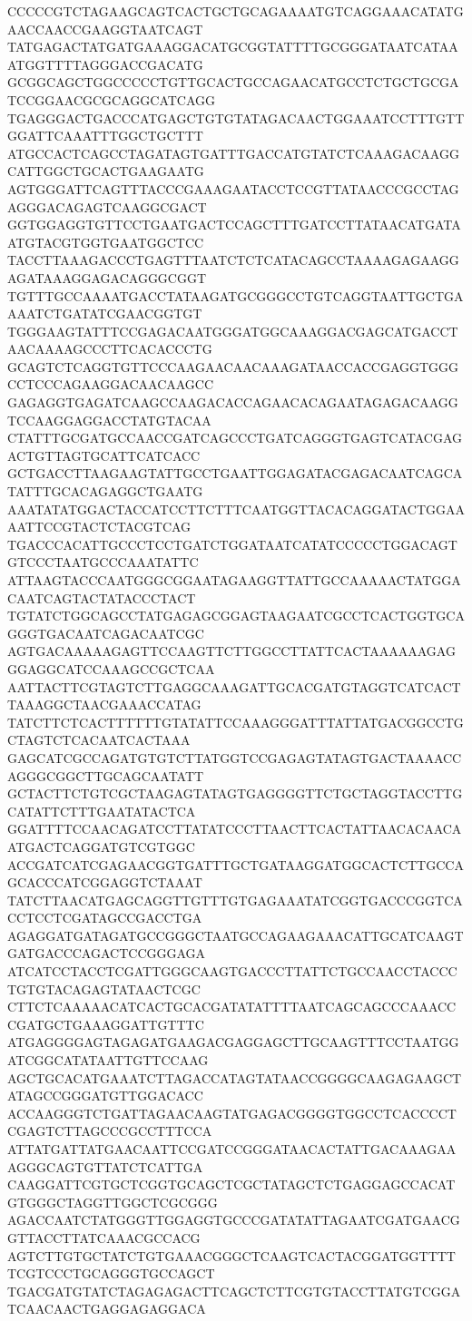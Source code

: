 CCCCCGTCTAGAAGCAGTCACTGCTGCAGAAAATGTCAGGAAACATATGAACCAACCGAAGGTAATCAGT
TATGAGACTATGATGAAAGGACATGCGGTATTTTGCGGGATAATCATAAATGGTTTTAGGGACCGACATG
GCGGCAGCTGGCCCCCTGTTGCACTGCCAGAACATGCCTCTGCTGCGATCCGGAACGCGCAGGCATCAGG
TGAGGGACTGACCCATGAGCTGTGTATAGACAACTGGAAATCCTTTGTTGGATTCAAATTTGGCTGCTTT
ATGCCACTCAGCCTAGATAGTGATTTGACCATGTATCTCAAAGACAAGGCATTGGCTGCACTGAAGAATG
AGTGGGATTCAGTTTACCCGAAAGAATACCTCCGTTATAACCCGCCTAGAGGGACAGAGTCAAGGCGACT
GGTGGAGGTGTTCCTGAATGACTCCAGCTTTGATCCTTATAACATGATAATGTACGTGGTGAATGGCTCC
TACCTTAAAGACCCTGAGTTTAATCTCTCATACAGCCTAAAAGAGAAGGAGATAAAGGAGACAGGGCGGT
TGTTTGCCAAAATGACCTATAAGATGCGGGCCTGTCAGGTAATTGCTGAAAATCTGATATCGAACGGTGT
TGGGAAGTATTTCCGAGACAATGGGATGGCAAAGGACGAGCATGACCTAACAAAAGCCCTTCACACCCTG
GCAGTCTCAGGTGTTCCCAAGAACAACAAAGATAACCACCGAGGTGGGCCTCCCAGAAGGACAACAAGCC
GAGAGGTGAGATCAAGCCAAGACACCAGAACACAGAATAGAGACAAGGTCCAAGGAGGACCTATGTACAA
CTATTTGCGATGCCAACCGATCAGCCCTGATCAGGGTGAGTCATACGAGACTGTTAGTGCATTCATCACC
GCTGACCTTAAGAAGTATTGCCTGAATTGGAGATACGAGACAATCAGCATATTTGCACAGAGGCTGAATG
AAATATATGGACTACCATCCTTCTTTCAATGGTTACACAGGATACTGGAAAATTCCGTACTCTACGTCAG
TGACCCACATTGCCCTCCTGATCTGGATAATCATATCCCCCTGGACAGTGTCCCTAATGCCCAAATATTC
ATTAAGTACCCAATGGGCGGAATAGAAGGTTATTGCCAAAAACTATGGACAATCAGTACTATACCCTACT
TGTATCTGGCAGCCTATGAGAGCGGAGTAAGAATCGCCTCACTGGTGCAGGGTGACAATCAGACAATCGC
AGTGACAAAAAGAGTTCCAAGTTCTTGGCCTTATTCACTAAAAAAGAGGGAGGCATCCAAAGCCGCTCAA
AATTACTTCGTAGTCTTGAGGCAAAGATTGCACGATGTAGGTCATCACTTAAAGGCTAACGAAACCATAG
TATCTTCTCACTTTTTTGTATATTCCAAAGGGATTTATTATGACGGCCTGCTAGTCTCACAATCACTAAA
GAGCATCGCCAGATGTGTCTTATGGTCCGAGAGTATAGTGACTAAAACCAGGGCGGCTTGCAGCAATATT
GCTACTTCTGTCGCTAAGAGTATAGTGAGGGGTTCTGCTAGGTACCTTGCATATTCTTTGAATATACTCA
GGATTTTCCAACAGATCCTTATATCCCTTAACTTCACTATTAACACAACAATGACTCAGGATGTCGTGGC
ACCGATCATCGAGAACGGTGATTTGCTGATAAGGATGGCACTCTTGCCAGCACCCATCGGAGGTCTAAAT
TATCTTAACATGAGCAGGTTGTTTGTGAGAAATATCGGTGACCCGGTCACCTCCTCGATAGCCGACCTGA
AGAGGATGATAGATGCCGGGCTAATGCCAGAAGAAACATTGCATCAAGTGATGACCCAGACTCCGGGAGA
ATCATCCTACCTCGATTGGGCAAGTGACCCTTATTCTGCCAACCTACCCTGTGTACAGAGTATAACTCGC
CTTCTCAAAAACATCACTGCACGATATATTTTAATCAGCAGCCCAAACCCGATGCTGAAAGGATTGTTTC
ATGAGGGGAGTAGAGATGAAGACGAGGAGCTTGCAAGTTTCCTAATGGATCGGCATATAATTGTTCCAAG
AGCTGCACATGAAATCTTAGACCATAGTATAACCGGGGCAAGAGAAGCTATAGCCGGGATGTTGGACACC
ACCAAGGGTCTGATTAGAACAAGTATGAGACGGGGTGGCCTCACCCCTCGAGTCTTAGCCCGCCTTTCCA
ATTATGATTATGAACAATTCCGATCCGGGATAACACTATTGACAAAGAAAGGGCAGTGTTATCTCATTGA
CAAGGATTCGTGCTCGGTGCAGCTCGCTATAGCTCTGAGGAGCCACATGTGGGCTAGGTTGGCTCGCGGG
AGACCAATCTATGGGTTGGAGGTGCCCGATATATTAGAATCGATGAACGGTTACCTTATCAAACGCCACG
AGTCTTGTGCTATCTGTGAAACGGGCTCAAGTCACTACGGATGGTTTTTCGTCCCTGCAGGGTGCCAGCT
TGACGATGTATCTAGAGAGACTTCAGCTCTTCGTGTACCTTATGTCGGATCAACAACTGAGGAGAGGACA
